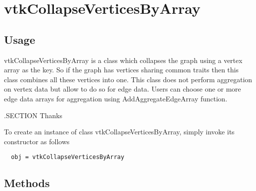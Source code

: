 \section{vtkCollapseVerticesByArray}

\subsection{Usage}

 vtkCollapseVerticesByArray is a class which collapses the graph using
 a vertex array as the key. So if the graph has vertices sharing common
 traits then this class combines all these vertices into one. This class
 does not perform aggregation on vertex data but allow to do so for edge data.
 Users can choose one or more edge data arrays for aggregation using
 AddAggregateEdgeArray function.

 .SECTION Thanks


To create an instance of class vtkCollapseVerticesByArray, simply
invoke its constructor as follows
\begin{verbatim}
  obj = vtkCollapseVerticesByArray
\end{verbatim}
\subsection{Methods}

